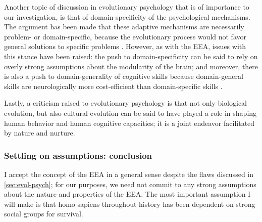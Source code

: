 Another topic of discussion in evolutionary psychology that is of importance to our investigation, is that of domain-specificity of the psychological mechanisms. The argument has been made that these adaptive mechanisms are necessarily problem- or domain-specific, because the evolutionary process would not favor general solutions to specific problems \citep[p.~50]{Buss15}.
However, as with the EEA, issues with this stance have been raised: the push to domain-specificity can be said to rely on overly strong assumptions about the modularity of the brain; and moreover, there is also a push to domain-generality of cognitive skills because domain-general skills are neurologically more cost-efficient than domain-specific skills \citep{LB02}.

Lastly, a criticism raised to evolutionary psychology is that not only biological evolution, but also cultural evolution can be said to have played a role in shaping human behavior and human cognitive capacities; it is a joint endeavor facilitated by nature and nurture.

\subsubsection{Settling on assumptions: conclusion}


I accept the concept of the EEA in a general sense despite the flaws discussed in \cref{sec:evol-psych}; for our purposes, we need not commit to any strong assumptions about the nature and properties of the EEA. The most important assumption I will make is that homo sapiens throughout history has been dependent on strong social groups for survival.


